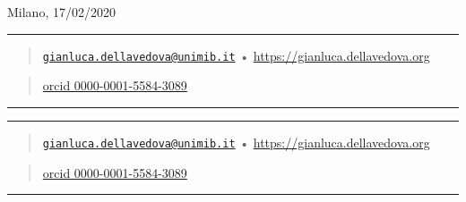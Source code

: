 \documentclass[
]{article}
\begin{document}
Milano, 17/02/2020

\begin{center}\rule{0.5\linewidth}{0.5pt}\end{center}

\begin{quote}
\href{mailto:gianluca.dellavedova@unimib.it}{\nolinkurl{gianluca.dellavedova@unimib.it}}
• \url{https://gianluca.dellavedova.org}
\end{quote}

\begin{quote}
\href{https://orcid.org/0000-0001-5584-3089}{orcid 0000-0001-5584-3089}
\end{quote}

\begin{center}\rule{0.5\linewidth}{0.5pt}\end{center}

\begin{center}\rule{0.5\linewidth}{0.5pt}\end{center}

\begin{quote}
\href{mailto:gianluca.dellavedova@unimib.it}{\nolinkurl{gianluca.dellavedova@unimib.it}}
• \url{https://gianluca.dellavedova.org}
\end{quote}

\begin{quote}
\href{http://orcid.org/0000-0001-5584-3089}{orcid 0000-0001-5584-3089}
\end{quote}

\begin{center}\rule{0.5\linewidth}{0.5pt}\end{center}
\end{document}
